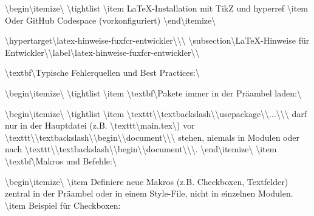 \textbackslash{}begin\textbackslash{}{itemize\textbackslash{}}
\textbackslash{}tightlist
\textbackslash{}item
  LaTeX-Installation mit TikZ und hyperref
\textbackslash{}item
  Oder GitHub Codespace (vorkonfiguriert)
\textbackslash{}end\textbackslash{}{itemize\textbackslash{}}

\textbackslash{}hypertarget\textbackslash{}{latex-hinweise-fuxfcr-entwickler\textbackslash{}}\textbackslash{}{\textbackslash{}%
\textbackslash{}subsection\textbackslash{}{LaTeX-Hinweise für Entwickler\textbackslash{}}\textbackslash{}label\textbackslash{}{latex-hinweise-fuxfcr-entwickler\textbackslash{}}\textbackslash{}}

\textbackslash{}textbf\textbackslash{}{Typische Fehlerquellen und Best Practices:\textbackslash{}}

\textbackslash{}begin\textbackslash{}{itemize\textbackslash{}}
\textbackslash{}tightlist
\textbackslash{}item
  \textbackslash{}textbf\textbackslash{}{Pakete immer in der Präambel laden:\textbackslash{}}

  \textbackslash{}begin\textbackslash{}{itemize\textbackslash{}}
  \textbackslash{}tightlist
  \textbackslash{}item
    \textbackslash{}texttt\textbackslash{}{\textbackslash{}textbackslash\textbackslash{}{\textbackslash{}}usepackage\textbackslash{}\textbackslash{}{...\textbackslash{}\textbackslash{}}\textbackslash{}} darf nur in der Hauptdatei (z.B. \textbackslash{}texttt\textbackslash{}{main.tex\textbackslash{}}) vor \textbackslash{}texttt\textbackslash{}{\textbackslash{}textbackslash\textbackslash{}{\textbackslash{}}begin\textbackslash{}\textbackslash{}{document\textbackslash{}\textbackslash{}}\textbackslash{}} stehen, niemals in Modulen oder nach \textbackslash{}texttt\textbackslash{}{\textbackslash{}textbackslash\textbackslash{}{\textbackslash{}}begin\textbackslash{}\textbackslash{}{document\textbackslash{}\textbackslash{}}\textbackslash{}}.
  \textbackslash{}end\textbackslash{}{itemize\textbackslash{}}
\textbackslash{}item
  \textbackslash{}textbf\textbackslash{}{Makros und Befehle:\textbackslash{}}

  \textbackslash{}begin\textbackslash{}{itemize\textbackslash{}}
  \textbackslash{}item
    Definiere neue Makros (z.B. Checkboxen, Textfelder) zentral in der Präambel oder in einem Style-File, nicht in einzelnen Modulen.
  \textbackslash{}item
    Beispiel für Checkboxen:

